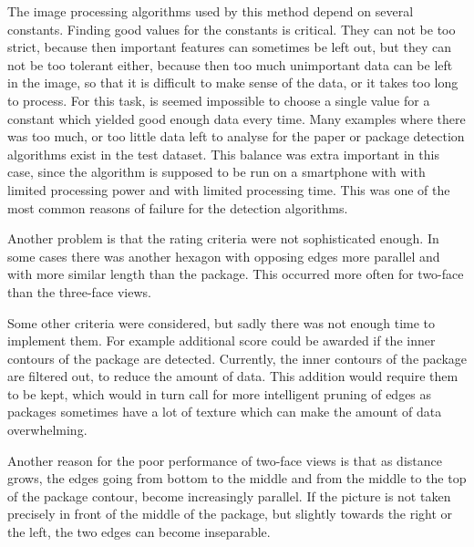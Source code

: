 The image processing algorithms used by this method depend on several constants.
Finding good values for the constants is critical.
They can not be too strict, because then important features can sometimes be left out, but they can not be too tolerant either, because then too much unimportant data can be left in the image, so that it is difficult to make sense of the data, or it takes too long to process.
For this task, is seemed impossible to choose a single value for a constant which yielded good enough data every time.
Many examples where there was too much, or too little data left to analyse for the paper or package detection algorithms exist in the test dataset.
This balance was extra important in this case, since the algorithm is supposed to be run on a smartphone with with limited processing power and with limited processing time.
This was one of the most common reasons of failure for the detection algorithms.

Another problem is that the rating criteria were not sophisticated enough.
In some cases there was another hexagon with opposing edges more parallel and with more similar length than the package.
This occurred more often for two-face than the three-face views.

Some other criteria were considered, but sadly there was not enough time to implement them.
For example additional score could be awarded if the inner contours of the package are detected.
Currently, the inner contours of the package are filtered out, to reduce the amount of data.
This addition would require them to be kept, which would in turn call for more intelligent pruning of edges as packages sometimes have a lot of texture which can make the amount of data overwhelming.

Another reason for the poor performance of two-face views is that as distance grows, the edges going from bottom to the middle and from the middle to the top of the package contour, become increasingly parallel. 
If the picture is not taken precisely in front of the middle of the package, but slightly towards the right or the left, the two edges can become inseparable.



